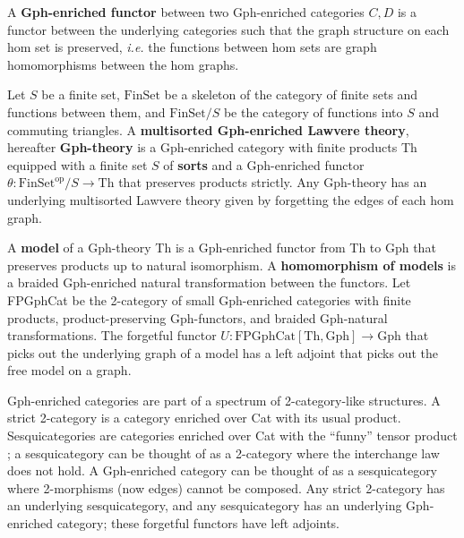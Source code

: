 \documentclass[a4paper,UKenglish]{article}
\newcommand{\maps}{\colon}
\newcommand{\Th}{\mathrm{Th}}
\newcommand{\Gph}{\mathrm{Gph}}
\newcommand{\FinSet}{\mathrm{FinSet}}
\newcommand{\FPGphCat}{\mathrm{FPGphCat}}
\newcommand{\op}{\mathrm{op}}
\begin{document}
A {\bf Gph-enriched functor} between two Gph-enriched categories $C, D$ is a functor between the underlying categories such that the graph structure on each hom set is preserved, {\em i.e.} the functions between hom sets are graph homomorphisms between the hom graphs.

Let $S$ be a finite set, $\FinSet$ be a skeleton of the category of finite sets and functions between them, and $\FinSet/S$ be the category of functions into $S$ and commuting triangles.  A {\bf multisorted Gph-enriched Lawvere theory}, hereafter {\bf Gph-theory} is a Gph-enriched category with finite products Th equipped with a finite set $S$ of {\bf sorts} and a Gph-enriched functor $\theta\maps \FinSet^{\op}/S \to \Th$ that preserves products strictly.  Any Gph-theory has an underlying multisorted Lawvere theory given by forgetting the edges of each hom graph.

A {\bf model} of a Gph-theory Th is a Gph-enriched functor from Th to Gph that preserves products up to natural isomorphism.  A {\bf homomorphism of models} is a braided Gph-enriched natural transformation between the functors.  Let FPGphCat be the 2-category of small Gph-enriched categories with finite products, product-preserving Gph-functors, and braided Gph-natural transformations.  The forgetful functor $U\maps \FPGphCat[\Th, \Gph] \to \Gph$ that picks out the underlying graph of a model has a left adjoint that picks out the free model on a graph.

Gph-enriched categories are part of a spectrum of 2-category-like structures.  A strict 2-category is a category enriched over Cat with its usual product.  Sesquicategories are categories enriched over Cat with the ``funny'' tensor product \cite{Lack2010}; a sesquicategory can be thought of as a 2-category where the interchange law does not hold.  A Gph-enriched category can be thought of as a sesquicategory where 2-morphisms (now edges) cannot be composed.  Any strict 2-category has an underlying sesquicategory, and any sesquicategory has an underlying Gph-enriched category; these forgetful functors have left adjoints.



\end{document}
